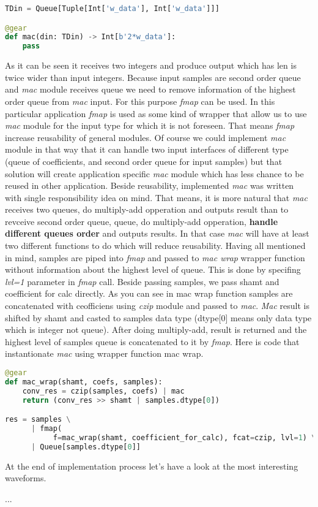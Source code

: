\documentclass[a4paper, 12pt]{article}
\begin{document}
\begin{lstlisting}[language=Python, caption=MAC wrapper function]
TDin = Queue[Tuple[Int['w_data'], Int['w_data']]]

@gear
def mac(din: TDin) -> Int[b'2*w_data']:
    pass
\end{lstlisting}

As it can be seen it receives two integers and produce output which has len  is twice wider than input integers.
Because input samples are second order queue and \textit{mac} module receives queue we need to remove information of the highest order queue from \textit{mac} input. For this purpose \textit{fmap} can be used. In this particular application \textit{fmap} is used as some kind of wrapper that allow us to use \textit{mac} module for the input type for which it is not foreseen. That means \textit{fmap} increase reusability of general modules. Of course we could implement \textit{mac} module in that way that it can handle two input interfaces of different type (queue of coefficients, and second order queue for input samples) but that solution will create application specific \textit{mac} module which has less chance to be reused in other application. Beside reusability, implemented \textit{mac} was written with single responsibility idea on mind. That means, it is more natural that \textit{mac} receives two queues, do multiply-add opperation and outputs result than to revceive second order queue, queue, do multiply-add opperation, \textbf{handle different queues order} and outputs results. In that case \textit{mac} will have at least two different functions to do which will reduce reusability.
Having all mentioned in mind, samples are piped into \textit{fmap} and  passed to \textit{mac wrap} wrapper function without information about the highest level of queue. This is done by specifing \textit{lvl=1} parameter in \textit{fmap} call. Beside passing samples, we pass shamt and coefficient for calc directly. As you can see in mac wrap function samples are concatenated with ceofficiens using \textit{czip} module and passed to \textit{mac}. \textit{Mac} result is shifted by shamt and casted to samples data type (dtype[0] means only data type which is integer not queue). After doing multiply-add, result is returned and the highest level of samples queue is concatenated to it by \textit{fmap}.
Here is code that instantionate \textit{mac} using wrapper function mac wrap.

\begin{lstlisting}[language=Python, caption=Instance of SDP]
@gear
def mac_wrap(shamt, coefs, samples):
    conv_res = czip(samples, coefs) | mac
    return (conv_res >> shamt | samples.dtype[0])

res = samples \
      | fmap(
           f=mac_wrap(shamt, coefficient_for_calc), fcat=czip, lvl=1) \
      | Queue[samples.dtype[0]]
\end{lstlisting}

At the end of implementation process let's have a look at the most interesting waveforms.

...
\end{document}
